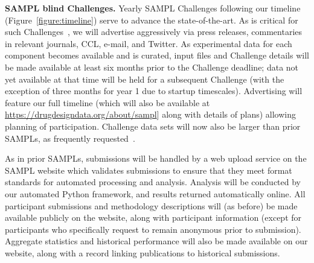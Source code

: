 \documentclass[11pt]{article}
\begin{document}
\textbf{SAMPL blind Challenges.} Yearly SAMPL Challenges following our timeline (Figure~\ref{figure:timeline}) serve to advance the state-of-the-art.
As is critical for such Challenges~\cite{Saez-Rodriguez:2016:NatRevGenet}, we will advertise aggressively via press releases, commentaries in relevant journals, CCL, e-mail, and Twitter. 
As experimental data for each component becomes available and is curated, input files and Challenge details will be made available at least six months prior to the Challenge deadline; data not yet available at that time will be held for a subsequent Challenge (with the exception of three months for year 1 due to startup timescales).
Advertising will feature our full timeline (which will also be available at \url{https://drugdesigndata.org/about/sampl}] along with details of plans) allowing planning of participation. 
Challenge data sets will now also be larger than prior SAMPLs, as frequently requested~\cite{Mobley:2017:eScholarship}. 


As in prior SAMPLs, submissions will be handled by a web upload service on the SAMPL website which validates submissions to ensure that they meet format standards for automated processing and analysis. 
Analysis will be conducted by our automated Python framework, and results returned automatically online.
All participant submissions and methodology descriptions will (as before) be made available publicly on the website, along with participant information (except for participants who specifically request to remain anonymous prior to submission).
Aggregate statistics and historical performance will also be made available on our website, along with a record linking publications to historical submissions.
\end{document}
